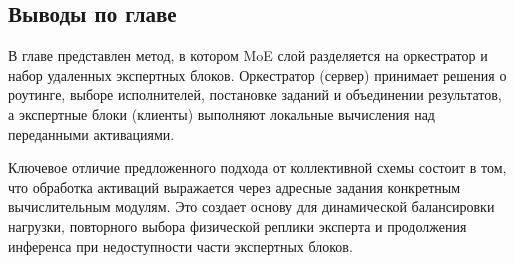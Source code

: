 \clearpage

\subsection*{Выводы по главе}

В главе представлен метод, в котором MoE слой разделяется на оркестратор и набор удаленных экспертных блоков. Оркестратор (сервер) принимает решения о роутинге, выборе исполнителей, постановке заданий и объединении результатов, а экспертные блоки (клиенты) выполняют локальные вычисления над переданными активациями.

Ключевое отличие предложенного подхода от коллективной схемы состоит в том, что обработка активаций выражается через адресные задания конкретным вычислительным модулям. Это создает основу для динамической балансировки нагрузки, повторного выбора физической реплики эксперта и продолжения инференса при недоступности части экспертных блоков.
